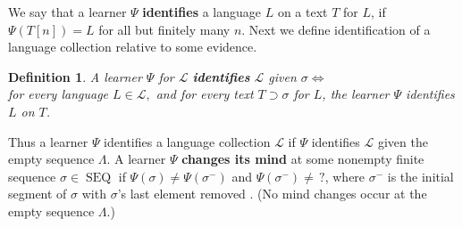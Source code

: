 \documentclass{elsarticle}%
\newtheorem{definition}[theorem]{Definition}
\DeclareMathOperator{\content}{content}
\DeclareMathOperator{\SEQ}{SEQ}
\renewcommand{\L}{\mathcal{L}}
\begin{document}
We say that a learner $\Psi$ \textbf{identifies} a language $L$ on a
text $T$ for $L$, if $\Psi(T[n])=L$ for all but finitely many $n$.
Next we define identification of a language collection relative to some evidence.

\begin{definition}
A learner $\Psi$ for $\L$ \textbf{identifies} $\L$ given $\sigma\iff$ \\ for every
language $L\in\L,$ and for every text $T\supset\sigma$ for $L$, the
learner $\Psi$ identifies $L$ on $T$.
\end{definition}
%
Thus a learner $\Psi$ identifies a language collection $\L$ if $\Psi$
identifies $\L$ given the empty sequence $\Lambda$.
A learner $\Psi$ \textbf{changes its mind} at some nonempty finite sequence
$\sigma\in\SEQ$ if $\Psi(\sigma)\not =\Psi(\sigma^{-})$ and $\Psi(\sigma
^{-})\not =\,?$, where $\sigma^{-}$ is the initial segment of $\sigma$ with
$\sigma$'s last element removed \cite[Ch.12.2]{jain99:_system_that_learn}. (No mind
changes occur at the empty sequence $\Lambda$.)
\end{document}
